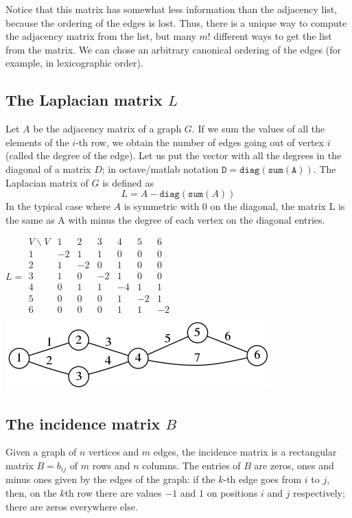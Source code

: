 Notice that this matrix has somewhat less information than the adjacency
list, because the ordering of the edges is lost.  Thus, there is a unique way
to compute the adjacency matrix from the list, but many $m!$ different ways
to get the list from the matrix.  We can chose an arbitrary canonical
ordering of the edges (for example, in lexicographic order).


\subsection{The Laplacian matrix $L$}


Let $A$ be the adjacency matrix of a graph $G$.
If we sum the values of all the elements of the $i$-th row, we obtain the
number of edges going out of vertex $i$ (called the degree of the edge).
Let us put the vector with all the degrees in the diagonal of a matrix $D$; in
octave/matlab notation $\mathtt{D=diag(sum(A))}$.
The Laplacian matrix of $G$ is defined as
\[
L = A - \mathtt{diag}(\mathtt{sum}(A))
\]
In the typical case where $A$ is symmetric with 0 on the diagonal, the matrix
L is the same as A with minus the degree of each vertex on the diagonal
entries.

$
L =
\begin{array}{l|lllllll}
	V\backslash V
	  & 1 & 2 & 3 & 4 & 5 & 6 \\
	\hline
	1 &-2 & 1 & 1 & 0 & 0 & 0 \\
	2 & 1 &-2 & 0 & 1 & 0 & 0 \\
	3 & 1 & 0 &-2 & 1 & 0 & 0 \\
	4 & 0 & 1 & 1 &-4 & 1 & 1 \\
	5 & 0 & 0 & 0 & 1 &-2 & 1 \\
	6 & 0 & 0 & 0 & 1 & 1 &-2 \\
\end{array}
$
\includegraphics{graph2.png}


\subsection{The incidence matrix $B$}


Given a graph of $n$ vertices and $m$ edges,
the incidence matrix is a rectangular matrix $B=b_{ij}$ of $m$ rows and $n$
columns.  The entries of $B$ are zeros, ones and minus ones given by the
edges of the graph: if the $k$-th edge goes from $i$ to $j$, then, on the
$k$th row there are values $-1$ and $1$ on positions $i$ and $j$
respectively; there are zeros everywhere else.


